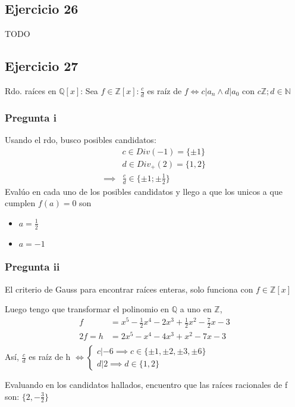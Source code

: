 \subsection{Ejercicio 26}
TODO

\subsection{Ejercicio 27}
Rdo. raíces en $ \mathbb{Q}[x] $: Sea $ f \in \mathbb{Z}[x]: \frac{c}{d} $ es raíz de $ f \iff c | a_n \wedge d|a_0 $ con $ c \mathbb{Z}; d \in \mathbb{N}   $

\subsubsection{Pregunta i}
Usando el rdo, busco posibles candidatos:
\begin{align*}
    &c \in Div(-1) = \{ \pm 1 \} \\
    &d \in Div_+(2) = \{ 1,2 \} \\
    \implies &\frac{c}{d} \in \{ \pm 1; \pm \frac{1}{2} \}
\end{align*}
Evalúo en cada uno de los posibles candidatos y llego a que los unicos a que cumplen $ f(a) = 0 $ son
\begin{itemize}
    \item $ a = \frac{1}{2} $
    \item $ a = -1 $
\end{itemize}
\subsubsection{Pregunta ii}

El criterio de Gauss para encontrar raíces enteras, solo funciona con $ f \in \mathbb{Z}[x] $

Luego tengo que transformar el polinomio en $ \mathbb{Q} $ a uno en $ \mathbb{Z} $,
\begin{align*}
    f &= x^5 - \frac{1}{2}x^4 - 2x^3 + \frac{1}{2}x^2 - \frac{7}{2}x - 3 \\
    2f = h &= 2x^5 - x^4 - 4x^3 + x^2 - 7x - 3 \\
\end{align*}
Así, $ \frac{c}{d} $ es raíz de h $ \iff \begin{cases}
    c|-6 \implies c \in \{ \pm 1, \pm 2, \pm 3, \pm 6 \} \\
    d|2 \implies d \in \{ 1,2 \}
\end{cases} $

Evaluando en los candidatos hallados, encuentro que las raíces racionales de f son: $ \{ 2, -\frac{3}{2} \} $

